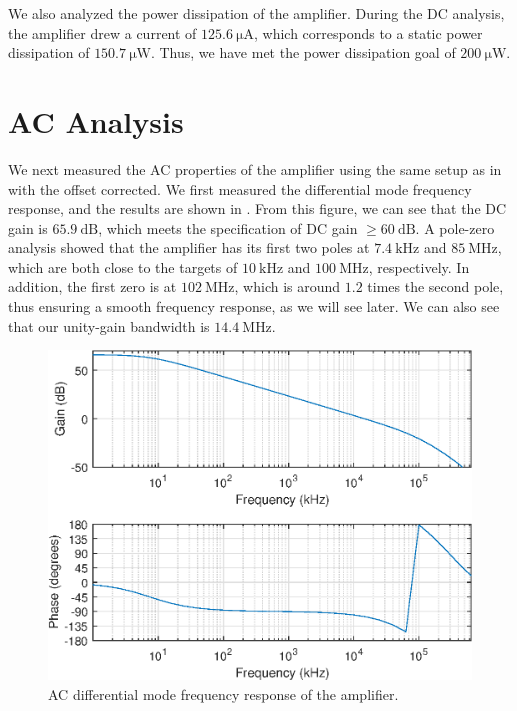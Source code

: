 \documentclass[journal,hidelinks]{IEEEtran}
\begin{document}
We also analyzed the power dissipation of the amplifier. During the DC analysis, the amplifier drew a current of $\SI{125.6}{\micro\ampere}$, which corresponds to a static power dissipation of $\SI{150.7}{\micro\watt}$. Thus, we have met the power dissipation goal of $\SI{200}{\micro\watt}$.

\section{AC Analysis}

We next measured the AC properties of the amplifier using the same setup as in  with the offset corrected. We first measured the differential mode frequency response, and the results are shown in . From this figure, we can see that the DC gain is $\SI{65.9}{\deci\bel}$, which meets the specification of DC gain $\ge \SI{60}{\deci\bel}$. A pole-zero analysis showed that the amplifier has its first two poles at $\SI{7.4}{\kilo\hertz}$ and $\SI{85}{\mega\hertz}$, which are both close to the targets of $\SI{10}{\kilo\hertz}$ and $\SI{100}{\mega\hertz}$, respectively. In addition, the first zero is at $\SI{102}{\mega\hertz}$, which is around $1.2$ times the second pole, thus ensuring a smooth frequency response, as we will see later. We can also see that our unity-gain bandwidth is $\SI{14.4}{\mega\hertz}$.

\begin{figure}[!htb]
  \centering
  \includegraphics[width=\columnwidth]{figures/ac_dm.eps}
  \caption{AC differential mode frequency response of the amplifier.}
  \label{fig:ac_dm}
\end{figure}
\end{document}
